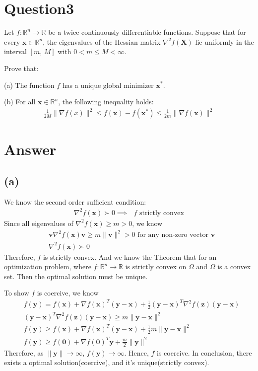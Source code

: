 \documentclass{article}
\newcommand{\R}{\mathbb{R}}
\begin{document}
\section*{Question3}
Let \(f: \R^n \to \R\) be a twice continuously differentiable functions. Suppose that for every \(\bm{x} \in \R^n\), the eigenvalues of the Hessian matrix \(\nabla^2 f(\bm{X})\) lie uniformly in the interval \([\textit{m, M}]\) with \(0 < m \leq M < \infty\).

Prove that:

(a) The function \(f\) has a unique global minimizer \(\bm{x}^{*}\).

(b) For all \(\bm{x} \in \R^n\), the following inequality holds:
\begin{align*}
    \frac{1}{2M} \|\nabla f(x)\|^2 \leq f(\bm{x}) - f(\bm{x}^*) \leq \frac{1}{2m} \|\nabla f(\bm{x})\|^2
\end{align*}

\section*{Answer}
\subsection*{(a)}
We know the second order sufficient condition:
\begin{align*}
    \nabla^2 f(\bm{x}) \succ 0 \implies \text{ \(f\) strictly convex}
\end{align*}
Since all eigenvalues of \(\nabla^2 f(\bm{x}) \geq m > 0\), we know
\begin{align*}
    &\bm{v} \nabla^2 f(\bm{x}) \bm{v} \geq m\|\bm{v}\|^2 > 0 \text{ for any non-zero vector \(\bm{v}\)}  \\
    &\nabla^2 f(\bm{x}) \succ 0
\end{align*} 
Therefore, \(f\) is strictly convex.
And we know the Theorem that for an optimization problem, where \(f: \R^n \to \R\) is strictly convex on \(\Omega\) and \(\Omega\) is a convex set. Then the optimal solution must be unique.

To show \(f\) is coercive, we know
\begin{align*}
    &f(\bm{y}) = f(\bm{x}) + \nabla f(\bm{x})^T (\bm{y} - \bm{x}) + \frac{1}{2} (\bm{y} - \bm{x})^T \nabla^2 f(\bm{z}) (\bm{y} - \bm{x}) \\
    &(\bm{y} - \bm{x})^T \nabla^2 f(\bm{z}) (\bm{y} - \bm{x}) \geq m \|\bm{y} - \bm{x}\|^2 \\
    &f(\bm{y}) \geq f(\bm{x}) + \nabla f(\bm{x})^T (\bm{y} - \bm{x}) + \frac{1}{2} m \|\bm{y} - \bm{x}\|^2  \\
    &f(\bm{y}) \geq f(\bm{0}) + \nabla f(\bm{0})^T \bm{y} + \frac{m}{2} \|\bm{y}\|^2
\end{align*}
Therefore, as \(\|\bm{y}\| \to \infty\), \(f(\bm{y}) \to \infty\). Hence, \(f\) is coercive.
In conclusion, there exists a optimal solution(coercive), and it's unique(strictly convex).
\end{document}
